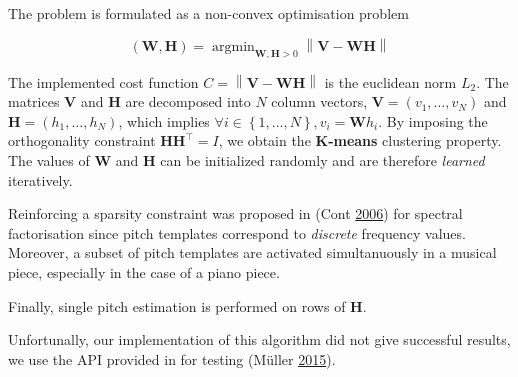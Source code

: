 \documentclass[
  american,
]{article}
\begin{document}
The problem is formulated as a non-convex optimisation problem

\[(\boldsymbol{W},\boldsymbol{H}) = \mathop{\mathrm{argmin}}_{\boldsymbol{W},\boldsymbol{H}>0} \left\lVert\boldsymbol{V}-\boldsymbol{W}\boldsymbol{H}\right\rVert\]

The implemented cost function \(C=\left\lVert\boldsymbol{V}-\boldsymbol{W}\boldsymbol{H}\right\rVert\) is the euclidean norm \(L_2\).
The matrices \(\boldsymbol{V}\) and \(\boldsymbol{H}\) are decomposed into \(N\) column vectors,
\(\boldsymbol{V}=(v_1,\ldots,v_N)\) and \(\boldsymbol{H}=(h_1,\ldots,h_N)\), which implies
\(\forall i\in\left\{1,\ldots,N\right\},v_i = \boldsymbol{W}h_i\).
By imposing the orthogonality constraint \(\boldsymbol{H}{\boldsymbol{H}}^{\top}=I\),
we obtain the \textbf{K-means} clustering property.
The values of \(\boldsymbol{W}\) and \(\boldsymbol{H}\) can be initialized randomly
and are therefore \emph{learned} iteratively.

Reinforcing a sparsity constraint was proposed in (Cont \protect\hyperlink{ref-cont_2006}{2006})
for spectral factorisation since pitch templates correspond to \emph{discrete}
frequency values.
Moreover, a subset of pitch templates are activated simultanuously
in a musical piece, especially in the case of a piano piece.

Finally, single pitch estimation is performed on rows of \(\boldsymbol{H}\).

Unfortunally, our implementation of this algorithm
did not give successful results, we use
the API provided in for testing (Müller \protect\hyperlink{ref-muller_2015}{2015}).
\end{document}
